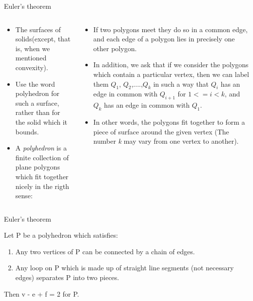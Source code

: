 \documentclass{beamer}
\begin{document}
\begin{frame}{Euler's theorem}
\begin{columns}
\begin{column}{0.4\textwidth}
  \begin{block}{}
    \begin{itemize}
    \item The surfaces of solids(except, that is, when we mentioned convexity).
    \item Use the word polyhedron for such a surface, rather than for the solid which it bounds.
    \item A \textsl{polyhedron} is a finite collection of plane polygons which fit together nicely in the rigth sense:
    \end{itemize}
  \end{block}
\end{column}
\begin{column}{0.6\textwidth}
  \begin{block}{}
    \begin{itemize}
    \item If two polygons meet they do so in a common edge, and each edge of a polygon lies in precisely one other polygon.
    \item In addition, we ask that if we consider the polygons which contain a particular vertex, then we can label them $Q_1$, $Q_2$,....,$Q_k$ in such a way that $Q_i$ has an edge in common with $Q_{i+1}$ for $1 <= i < k$, and $Q_k$ has an edge in common with $Q_1$.
    \item In other words, the polygons fit together to form a piece of surface around the given vertex (The number \textsl{k} may vary from one vertex to another).
    \end{itemize}
  \end{block}
\end{column}
\end{columns}
\end{frame}

\begin{frame}{Euler's theorem}
\begin{theorem}
  Let P be a polyhedron which satisfies:
  \begin{enumerate}[label={(\alph*)}]
    \item Any two vertices of P can be connected by a chain of edges.
    \item Any loop on P which is made up of straight line segments (not necessary edges) separates P into two pieces.
  \end{enumerate}
  Then v - e + f = 2 for P.
\end{theorem}
\end{frame}
\end{document}
